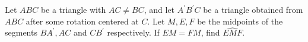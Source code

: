 Let $ABC$ be a triangle with $AC\neq BC$, and let $A^{\prime }B^{\prime }C$ be a triangle obtained from $ABC$ after some rotation centered at $C$. Let $M,E,F$ be the midpoints of the segments $BA^{\prime },AC$ and $CB^{\prime }$  respectively. If $EM=FM$, find $\widehat{EMF}$.